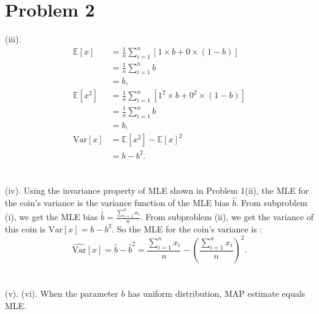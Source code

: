 \documentclass[twoside,11pt]{homework}
\date{\today} %
\begin{document}
\maketitle


\section*{Problem 2}
(iii).
%
\begin{equation}
\begin{split}
\mathbb{E} [x] &= \frac{1}{n} \sum_{i=1}^n [1 \times b + 0 \times (1-b)]\\
		      &= \frac{1}{n} \sum_{i=1}^n b \\
		      &= b, \\
\mathbb{E} [x^2 ] 	&= \frac{1}{n} \sum_{i=1}^n [1^2 \times b + 0^2 \times (1-b)]\\
		      &= \frac{1}{n} \sum_{i=1}^n b \\
		      &= b, \\
\mathrm{Var}[x] &= \mathbb{E} [x^2 ] - \mathbb{E} [x]^2 \\
		        &= b - b^2.
\end{split}
\end{equation}
%
\\\\
(iv).
Using the invariance property of MLE shown in Problem 1(ii), the MLE for the coin's variance is the variance function of the MLE bias $\hat{b}$.
From subproblem (i), we get the MLE bias $\hat{b} =\frac{\sum_{i=1}^n x_i}{n} $.
From subproblem (ii), we get the variance of this coin is $\mathrm{Var}[x] = b - b^2$.
So the MLE for the coin's variance is :
%
\begin{equation}
\hat{\mathrm{Var}}[x] = \hat{b}- \hat{b}^2 = \frac{\sum_{i=1}^n x_i}{n} - (\frac{\sum_{i=1}^n x_i}{n})^2.
\end{equation}
\\\\
(v).
\newpage
(vi).
When the parameter $b$ has uniform distribution, MAP estimate equals MLE.
\end{document}
